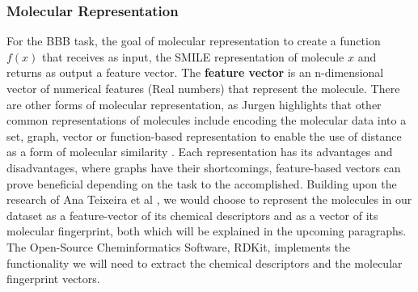 \documentclass[a4paper,12pt]{report}
\begin{document}
			\subsubsection{Molecular Representation}
			For the BBB task, the goal of molecular representation to create a function $f(x)$ that receives as input, the SMILE representation of molecule $x$ and returns as output a feature vector. The \textbf{feature vector} is an n-dimensional vector of numerical features (Real numbers) that represent the molecule. 
			There are other forms of molecular representation, as Jurgen \cite{Jurgen2004} highlights that other common representations of molecules include encoding the molecular data into a set, graph, vector or function-based representation to enable the use of distance as a form of molecular similarity \cite{Jurgen2004}. Each representation has its advantages and disadvantages, where graphs have their shortcomings, feature-based vectors can prove beneficial depending on the task to the accomplished. Building upon the research of Ana Teixeira et al \cite{Anaetal2012}, we would choose to represent the molecules in our dataset as a feature-vector of its chemical descriptors and as a vector of its molecular fingerprint, both which will be explained in the upcoming paragraphs. The Open-Source Cheminformatics Software, RDKit, implements the functionality we will need to extract the chemical descriptors and the molecular fingerprint vectors.
\end{document}
